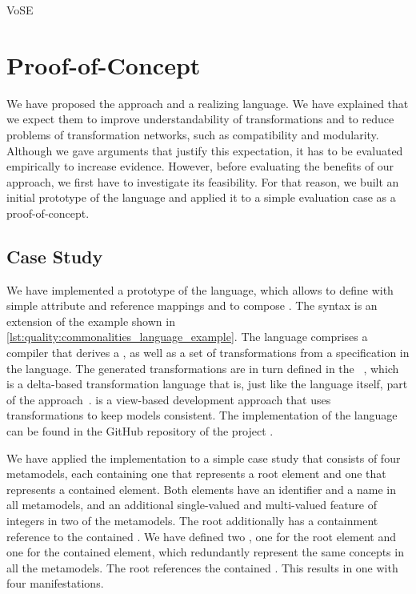 \begin{copiedFrom}{VoSE}

\section*{Proof-of-Concept}

We have proposed the \commonalities approach and a realizing language.
We have explained that we expect them to improve understandability of transformations and to reduce problems of transformation networks, such as compatibility and modularity.
Although we gave arguments that justify this expectation, it has to be evaluated empirically to increase evidence.
However, before evaluating the benefits of our approach, we first have to investigate its feasibility.
For that reason, we built an initial prototype of the language and applied it to a simple evaluation case as a proof-of-concept.



\subsection*{Case Study}

We have implemented a prototype of the \commonalities language, which allows to define \commonalities with simple attribute and reference mappings and to compose \commonalities.
The syntax is an extension of the example shown in \autoref{lst:quality:commonalities_language_example}.
The language comprises a compiler that derives a \conceptmetamodel, as well as a set of transformations from a specification in the language.
The generated transformations are in turn defined in the \reactionslanguage~\cite{klare2016b}, which is a delta-based transformation language that is, just like the \commonalities language itself, part of the \vitruv approach~\cite{kramer2013b}.
\vitruv is a view-based development approach that uses transformations to keep models consistent.
The implementation of the \commonalities language can be found in the GitHub repository of the \vitruv project \cite{vitruvFrameworkGithub}. %

We have applied the implementation to a simple case study that consists of four metamodels, each containing one \metaclass that represents a root element and one that represents a contained element. 
Both elements have an identifier and a name in all metamodels, and an additional single-valued and multi-valued feature of integers in two of the metamodels.
The root \metaclass additionally has a containment reference to the contained \metaclass.
We have defined two \commonalities, one for the root element and one for the contained element, which redundantly represent the same concepts in all the metamodels.
The root \commonality references the contained \commonality.
This results in one \conceptmetamodel with four manifestations.


\end{copiedFrom}

